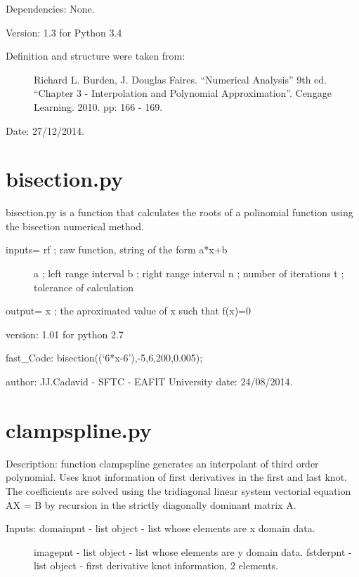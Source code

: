 \documentclass[letterpaper,10pt,oneside]{sphinxmanual}
\theoremstyle{plain}%
\theoremstyle{definition}%
\theoremstyle{remark}%
\begin{document}
Dependencies: None.

Version: 1.3 for Python 3.4
\begin{description}
\item[{Definition and structure were taken from:}] \leavevmode
Richard L. Burden, J. Douglas Faires. ``Numerical Analysis'' 9th ed.
``Chapter 3 - Interpolation and Polynomial Approximation''. 
Cengage Learning. 2010. pp: 166 - 169.

\end{description}




Date: 27/12/2014.


\section{bisection.py}
\label{code:bisection-py}\label{code:module-bisection}
bisection.py is a function that calculates the roots of a polinomial function
using the bisection numerical method.
\begin{description}
\item[{inputs= rf ; raw function, string of the form a*x+b}] \leavevmode
a ; left range interval
b ; right range interval
n ; number of iterations
t ; tolerance of calculation

\end{description}

output= x ; the aproximated value of x such that f(x)=0

version: 1.01 for python 2.7

fast\_Code: bisection((`6*x-6'),-5,6,200,0.005);

author: JJ.Cadavid - SFTC - EAFIT University
date: 24/08/2014.


\section{clampspline.py}
\label{code:module-clampspline}\label{code:clampspline-py}
Description: function clampspline generates an interpolant of third order 
polynomial. Uses knot information of first derivatives in the first and last
knot. The coefficients are solved using the tridiagonal linear system 
vectorial equation AX = B by recursion in the strictly diagonally dominant 
matrix A.
\begin{description}
\item[{Inputs: domainpnt - list object - list whose elements are x domain data.}] \leavevmode
imagepnt - list object - list whose elements are y domain data.
fstderpnt - list object - first derivative knot information, 2 elements.

\end{description}
\end{document}
